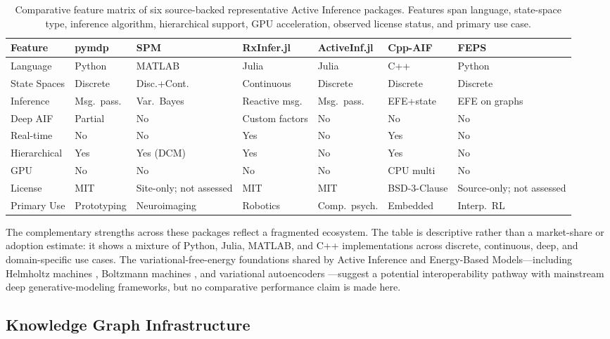 \documentclass[
  english,
]{article}
\begin{document}
\begin{table}[H]
\centering
\caption{Comparative feature matrix of six source-backed representative Active Inference packages. Features span language, state-space type, inference algorithm, hierarchical support, GPU acceleration, observed license status, and primary use case.}
\label{tab:aif_feature_matrix}
\small
\begin{tabular}{lllllll}
\toprule
\textbf{Feature} & \textbf{pymdp} & \textbf{SPM} & \textbf{RxInfer.jl} & \textbf{ActiveInf.jl} & \textbf{Cpp-AIF} & \textbf{FEPS} \\
\midrule
Language & Python & MATLAB & Julia & Julia & C++ & Python \\
State Spaces & Discrete & Disc.+Cont. & Continuous & Discrete & Discrete & Discrete \\
Inference & Msg.\ pass. & Var.\ Bayes & Reactive msg. & Msg.\ pass. & EFE+state & EFE on graphs \\
Deep AIF & Partial & No & Custom factors & No & No & No \\
Real-time & No & No & Yes & No & Yes & No \\
Hierarchical & Yes & Yes (DCM) & Yes & No & Yes & No \\
GPU & No & No & No & No & CPU multi & No \\
License & MIT & Site-only; not assessed & MIT & MIT & BSD-3-Clause & Source-only; not assessed \\
Primary Use & Prototyping & Neuroimaging & Robotics & Comp.\ psych. & Embedded & Interp.\ RL \\
\bottomrule
\end{tabular}
\end{table}

The complementary strengths across these packages reflect a fragmented
ecosystem. The table is descriptive rather than a market-share or
adoption estimate: it shows a mixture of Python, Julia, MATLAB, and C++
implementations across discrete, continuous, deep, and domain-specific
use cases. The variational-free-energy foundations shared by Active
Inference and Energy-Based Models---including Helmholtz machines
\citep{dayan1995helmholtz}, Boltzmann machines
\citep{hinton2002training}, and variational autoencoders
\citep{kingma2014auto}---suggest a potential interoperability pathway
with mainstream deep generative-modeling frameworks, but no comparative
performance claim is made here.

\FloatBarrier

\subsection{Knowledge Graph
Infrastructure}\label{knowledge-graph-infrastructure}
\end{document}
